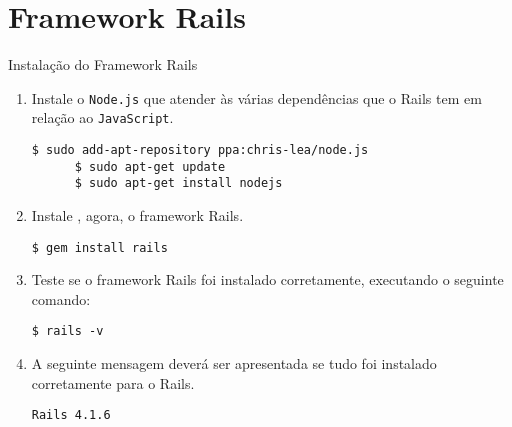 \section{Framework Rails}
\begin{frame}{Instalação do Framework Rails}
  \begin{enumerate}
    \item Instale o \verb!Node.js! que atender às várias dependências que 
      o Rails tem em relação ao \verb!JavaScript!.
    \begin{lstlisting}[style=BashInputStyle]      
      $ sudo add-apt-repository ppa:chris-lea/node.js
      $ sudo apt-get update
      $ sudo apt-get install nodejs
    \end{lstlisting}

    \item Instale , agora, o framework Rails.
    \begin{lstlisting}[style=BashInputStyle]      
      $ gem install rails
    \end{lstlisting}
    
     \item Teste se o framework Rails foi instalado corretamente, executando
      o seguinte comando:
    \begin{lstlisting}[style=BashInputStyle]
      $ rails -v 
    \end{lstlisting}
    
    \item A seguinte mensagem deverá ser apresentada se tudo foi instalado corretamente
      para o Rails.
    \begin{lstlisting}[style=BashInputStyle]
      Rails 4.1.6
    \end{lstlisting}
  \end{enumerate}
  
\end{frame}
